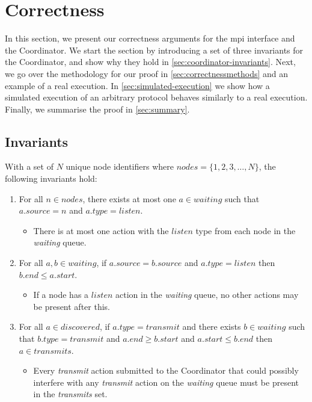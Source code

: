 \section{Correctness}\label{sec:correctness}
In this section, we present our correctness arguments for the \gls{mpi} interface and the Coordinator. We
start the section by introducing a set of three invariants for the Coordinator, and show why they hold in
\autoref{sec:coordinator-invariants}. Next, we go over the methodology for our proof in
\autoref{sec:correctnessmethods} and an example of a real execution. In \autoref{sec:simulated-execution} we
show how a simulated execution of an arbitrary protocol behaves similarly to a real execution. Finally, we
summarise the proof in \autoref{sec:summary}.

\subsection{Invariants}\label{sec:coordinator-invariants}

With a set of $N$ unique node identifiers where $\mathit{nodes} = \{ 1, 2, 3, \ldots, N \}$, the following
invariants hold:

\begin{enumerate}
    \item For all $n \in \mathit{nodes}$, there exists at most one $a \in \mathit{waiting}$ such that
          $a.\mathit{source} = n$ and $a.\mathit{type} = \mathit{listen}$.
          \begin{itemize}
              \item There is at most one action with the $\mathit{listen}$ type from each node in the
                    \textit{waiting} queue.
          \end{itemize}
    \item For all $a, b \in \mathit{waiting}$, if $a.\mathit{source} = b.\mathit{source}$ and $a.\mathit{type}
              = \mathit{listen}$ then $b.\mathit{end} \leq a.\mathit{start}$.
          \begin{itemize}
              \item If a node has a $\mathit{listen}$ action in the \textit{waiting} queue, no other actions
                    may be present after this.
          \end{itemize}
    \item For all $a \in \mathit{discovered}$, if $a.\mathit{type} = \mathit{transmit}$ and there exists $b
              \in \mathit{waiting}$ such that $b.\mathit{type} = \mathit{transmit}$ and $a.\mathit{end} \geq
              b.\mathit{start}$ and $a.\mathit{start} \leq b.\mathit{end}$ then $a \in \mathit{transmits}$.
          \begin{itemize}
              \item Every \textit{transmit} action submitted to the Coordinator that could possibly interfere
                    with any \textit{transmit} action on the \textit{waiting} queue must be present in the
                    \textit{transmits} set.
          \end{itemize}
\end{enumerate}

